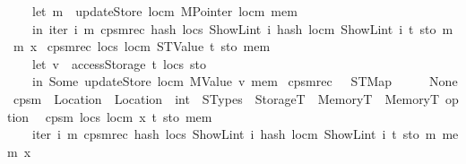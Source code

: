 \begin{isabellebody}
\ \ \ \ {\isacharparenleft}{\kern0pt}let\ m\ {\isacharequal}{\kern0pt}\ updateStore\ locm\ {\isacharparenleft}{\kern0pt}MPointer\ locm{\isacharparenright}{\kern0pt}\ mem\isanewline
\ \ \ \ in\ iter{\isacharprime}{\kern0pt}\ {\isacharparenleft}{\kern0pt}{\isasymlambda}i\ m{\isacharprime}{\kern0pt}{\isachardot}{\kern0pt}\ cps{}mrec\ {\isacharparenleft}{\kern0pt}hash\ locs\ {\isacharparenleft}{\kern0pt}ShowL\isactrlsub i\isactrlsub n\isactrlsub t\ i{\isacharparenright}{\kern0pt}{\isacharparenright}{\kern0pt}\ {\isacharparenleft}{\kern0pt}hash\ locm\ {\isacharparenleft}{\kern0pt}ShowL\isactrlsub i\isactrlsub n\isactrlsub t\ i{\isacharparenright}{\kern0pt}{\isacharparenright}{\kern0pt}\ t\ sto\ m{\isacharprime}{\kern0pt}{\isacharparenright}{\kern0pt}\ m\ x{\isacharparenright}{\kern0pt}{\isachardoublequoteclose}\isanewline
{\isacharbar}{\kern0pt}\ {\isachardoublequoteopen}cps{}mrec\ locs\ locm\ {\isacharparenleft}{\kern0pt}STValue\ t{\isacharparenright}{\kern0pt}\ sto\ mem\ {\isacharequal}{\kern0pt}\isanewline
\ \ \ \ {\isacharparenleft}{\kern0pt}let\ v\ {\isacharequal}{\kern0pt}\ accessStorage\ t\ locs\ sto\isanewline
\ \ \ \ in\ Some\ {\isacharparenleft}{\kern0pt}updateStore\ locm\ {\isacharparenleft}{\kern0pt}MValue\ v{\isacharparenright}{\kern0pt}\ mem{\isacharparenright}{\kern0pt}{\isacharparenright}{\kern0pt}{\isachardoublequoteclose}\isanewline
{\isacharbar}{\kern0pt}\ {\isachardoublequoteopen}cps{}mrec\ {\isacharunderscore}{\kern0pt}\ {\isacharunderscore}{\kern0pt}\ {\isacharparenleft}{\kern0pt}STMap\ {\isacharunderscore}{\kern0pt}\ {\isacharunderscore}{\kern0pt}{\isacharparenright}{\kern0pt}\ {\isacharunderscore}{\kern0pt}\ {\isacharunderscore}{\kern0pt}\ {\isacharequal}{\kern0pt}\ None{\isachardoublequoteclose}\isanewline
\isanewline
{}\isamarkupfalse%
\ cps{}m\ {\isacharcolon}{\kern0pt}{\isacharcolon}{\kern0pt}\ {\isachardoublequoteopen}Location\ {\isasymRightarrow}\ Location\ {\isasymRightarrow}\ int\ {\isasymRightarrow}\ STypes\ {\isasymRightarrow}\ StorageT\ {\isasymRightarrow}\ MemoryT\ {\isasymRightarrow}\ MemoryT\ option{\isachardoublequoteclose}\isanewline
{}\isanewline
\ \ {\isachardoublequoteopen}cps{}m\ locs\ locm\ x\ t\ sto\ mem\ {\isacharequal}{\kern0pt}\isanewline
\ \ \ \ iter{\isacharprime}{\kern0pt}\ {\isacharparenleft}{\kern0pt}{\isasymlambda}i\ m{\isacharprime}{\kern0pt}{\isachardot}{\kern0pt}\ cps{}mrec\ {\isacharparenleft}{\kern0pt}hash\ locs\ {\isacharparenleft}{\kern0pt}ShowL\isactrlsub i\isactrlsub n\isactrlsub t\ i{\isacharparenright}{\kern0pt}{\isacharparenright}{\kern0pt}\ {\isacharparenleft}{\kern0pt}hash\ locm\ {\isacharparenleft}{\kern0pt}ShowL\isactrlsub i\isactrlsub n\isactrlsub t\ i{\isacharparenright}{\kern0pt}{\isacharparenright}{\kern0pt}\ t\ sto\ m{\isacharprime}{\kern0pt}{\isacharparenright}{\kern0pt}\ mem\ x{\isachardoublequoteclose}\isanewline

\end{isabellebody}
